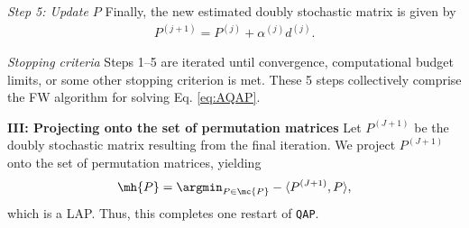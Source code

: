\documentclass[10pt,journal,cspaper,compsoc]{IEEEtran}
\newcommand{\PmcP}{P \in \mc{P}}
\begin{document}

\emph{Step 5: Update $P$} Finally, the new estimated doubly stochastic matrix is given by
\begin{align}\label{eq:update}
	P^{(j+1)} = P^{(j)} + \alpha^{(j)} d^{(j)}.
\end{align}


\emph{Stopping criteria} Steps 1--5 are iterated until convergence, computational budget limits, or some other stopping criterion is met.  These 5 steps collectively comprise the FW algorithm for solving Eq. \eqref{eq:AQAP}.  %


\textbf{III: Projecting onto the set of permutation matrices}   Let $P^{(J+1)}$ be the doubly stochastic matrix resulting from the final iteration.  We project $P^{(J+1)}$ onto the set of permutation matrices, yielding
\begin{align} \label{eq:proj}
	\mh{P} = \argmin_{\PmcP} -\langle P^{(J+1)}, P \rangle,
\end{align}
which is a LAP.  Thus, this completes one restart of \texttt{QAP}.




% 
\end{document}
